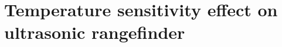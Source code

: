 
\chapter{Temperature sensitivity effect on ultrasonic rangefinder} \label{app:temperature}

\initial{\textcolor{red}{Pending}}
